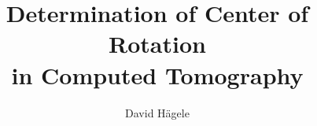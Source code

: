 \documentclass[10pt,journal,compsoc]{IEEEtran}
\begin{document}
%
\title{Determination of Center of Rotation \\ in Computed Tomography}
%
%
%
%

\author{David H{\"a}gele}

% 
%
\end{document}
